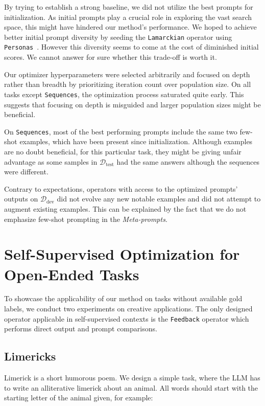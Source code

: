 By trying to establish a strong baseline, we did not utilize the best prompts for initialization. 
As initial prompts play a crucial role\cite{yang2024dualphaseacceleratedpromptoptimization} in exploring the vast search space,
this might have hindered our method's performance. We hoped to achieve better initial prompt diversity by seeding the \texttt{Lamarckian} operator using \texttt{Personas}~\cite{ge2024scalingsyntheticdatacreation}.
However this diversity seems to come at the cost of diminished initial scores. We cannot answer for sure whether this trade-off is worth it. 

Our optimizer hyperparameters were selected arbitrarily and focused on depth rather than breadth by prioritizing iteration count over population size.
On all tasks except \texttt{Sequences}, the optimization process saturated quite early. This suggests that focusing on depth is misguided 
and larger population sizes might be beneficial.

On \texttt{Sequences}, most of the best performing prompts include the same two few-shot examples, which have been present since initialization.
Although examples are no doubt beneficial, for this particular task, they might be giving unfair advantage as some 
samples in $\mathcal{D}_{\text{test}}$ had the same answers although the sequences were different.  

Contrary to expectations, operators with access to the optimized prompts' outputs on $\mathcal{D}_{\text{dev}}$ did not evolve any new notable examples 
and did not attempt to augment existing examples. This can be explained by the fact that we do not emphasize few-shot prompting in the \textit{Meta-prompts}.
\newpage

\section{Self-Supervised Optimization for Open-Ended Tasks}
To showcase the applicability of our method on tasks without available gold labels, we conduct two experiments
on creative applications. The only designed operator applicable in self-supervised contexts is the \texttt{Feedback} 
operator which performs direct output and prompt comparisons.

\subsection{Limericks}
Limerick is a short humorous poem. We design a simple task, where the LLM has to write an alliterative limerick about an animal. 
All words should start with the starting letter of the animal given, for example:

